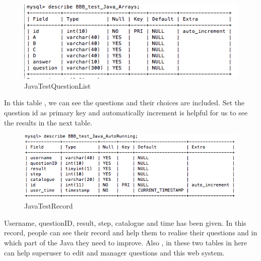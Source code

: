 \documentclass[12pt]{article}
\begin{document}
	\begin{figure}[H]
	\centering	
\includegraphics[width=15cm]{images/JavaTestQuestionList.jpg}
	\caption[JavaTestQuestionList]{JavaTestQuestionList}
	\label{JavaTestQuestionList}
\end{figure}
	In this table ,  we can see the questions and their choices are included. Set the question id as primary key and automatically increment is helpful for us to see the results in the next table.
		\begin{figure}[H]
	\centering	
\includegraphics[width=15cm]{images/JavaTestRecord.jpg}

	\caption[JavaTestRecord]{JavaTestRecord}
	\label{JavaTestRecord}
\end{figure}
	 Username, questionID, result, step, catalogue and time has been given. In this record, people can see their record and help them to realise  their questions and in which part of the Java they need to improve. Also , in these two tables in here can help superuser to edit and manager questions and this web system. 
\newpage
\end{document}
